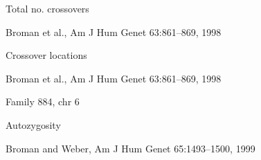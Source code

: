 \documentclass[aspectratio=169,12pt,t]{beamer}
\begin{document}
\begin{frame}{Total no. crossovers}

\vspace{6mm}


\vspace{10mm}


\hfill {\scriptsize \lolit
Broman et al., Am J Hum Genet 63:861--869, 1998}

\end{frame}



\begin{frame}{Crossover locations}

\vspace{2mm}


\vspace{4mm}

\hfill {\scriptsize \lolit
Broman et al., Am J Hum Genet 63:861--869, 1998}

\end{frame}




\begin{frame}[c]{Family 884, chr 6}




\end{frame}



\begin{frame}[c]{}


\end{frame}


\begin{frame}{Autozygosity}

  \vspace{4mm}


\vspace{8mm}

\hfill {\scriptsize \lolit Broman and Weber, Am J Hum Genet 65:1493--1500, 1999}

\end{frame}



\begin{frame}[c]{}


\end{frame}
\end{document}
